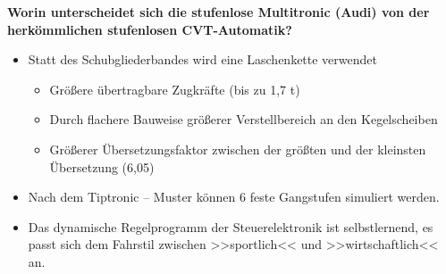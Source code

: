 \textbf{Worin unterscheidet sich die stufenlose Multitronic (Audi) von
der herkömmlichen stufenlosen CVT-Automatik?}

\begin{itemize}
\item
  Statt des Schubgliederbandes wird eine Laschenkette verwendet

  \begin{itemize}
  \item
    Größere übertragbare Zugkräfte (bis zu 1,7 t)
  \item
    Durch flachere Bauweise größerer Verstellbereich an den
    Kegelscheiben
  \item
    Größerer Übersetzungsfaktor zwischen der größten und der kleinsten
    Übersetzung (6,05)
  \end{itemize}
\item
  Nach dem Tiptronic -- Muster können 6 feste Gangstufen simuliert
  werden.
\item
  Das dynamische Regelprogramm der Steuerelektronik ist selbstlernend,
  es passt sich dem Fahrstil zwischen >>sportlich<< und
  >>wirtschaftlich<< an.
\end{itemize}
